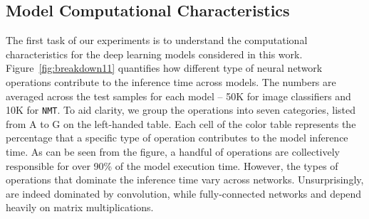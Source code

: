 \subsection{Model Computational Characteristics}
The first task of our experiments is to understand the computational characteristics for the deep learning models considered in this work.
Figure~\ref{fig:breakdown11} quantifies how different type of neural network operations contribute to the inference time across models. The
numbers are averaged across the test samples for each model -- 50K for image classifiers and 10K for \texttt{NMT}. To aid clarity, we group
the operations into seven categories, listed from A to G on the left-handed table. Each cell of the color table represents the percentage
that a specific type of operation contributes to the model inference time. As can be seen from the figure, a handful of operations are
collectively responsible for over 90\% of the model execution time. However, the types of operations that dominate the inference time vary
across networks. Unsurprisingly, \CNNs are indeed dominated by convolution, while fully-connected networks and \RNNs depend heavily on
matrix multiplications.

